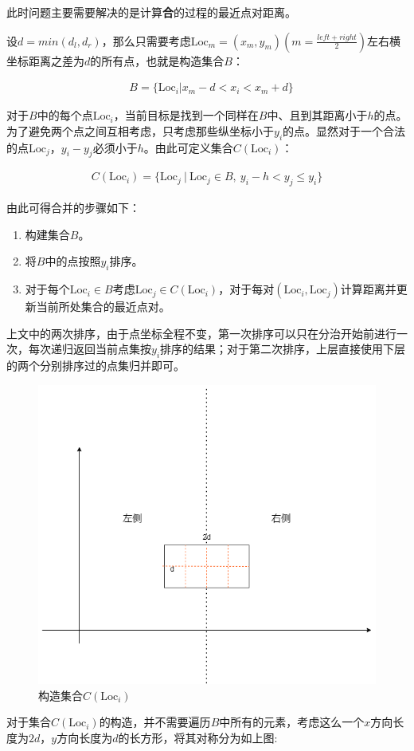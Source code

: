 \documentclass{article}
\begin{document}
此时问题主要需要解决的是计算\textbf{合}的过程的最近点对距离。

设$d = min(d_l, d_r)$，那么只需要考虑$\text{Loc}_{m}=(x_{m}, y_{m})(m = \frac{left + right}{2})$左右横坐标距离之差为$d$的所有点，也就是构造集合$B$：

\begin{align*}
    &B=\{\text{Loc}_i |x_m-d < x_i < x_m+d\}
\end{align*}

对于$B$中的每个点$\text{Loc}_i$，当前目标是找到一个同样在$B$中、且到其距离小于$h$的点。为了避免两个点之间互相考虑，只考虑那些纵坐标小于$y_i$的点。显然对于一个合法的点$\text{Loc}_j$，$y_i-y_j$必须小于$h$。由此可定义集合$C(\text{Loc}_i)$：

\begin{align*}
    C(\text{Loc}_i)=\{\text{Loc}_j\ \big|\ \text{Loc}_j\in B,\ y_i-h<y_j\le y_i\}
\end{align*}

由此可得合并的步骤如下：

\begin{enumerate}
    \item 构建集合$B$。
    \item 将$B$中的点按照$y_i$排序。
    \item 对于每个$\text{Loc}_i\in B$考虑$\text{Loc}_j\in C(\text{Loc}_i)$，对于每对$(\text{Loc}_i,\text{Loc}_j)$计算距离并更新当前所处集合的最近点对。
\end{enumerate}

上文中的两次排序，由于点坐标全程不变，第一次排序可以只在分治开始前进行一次，每次递归返回当前点集按$y_i$排序的结果；对于第二次排序，上层直接使用下层的两个分别排序过的点集归并即可。
\begin{figure}[h]
    \centering
    \includegraphics[width=0.4\linewidth]{asserts/最短点对问题.drawio.png}
    \caption{构造集合$C(\text{Loc}_i)$}
    \label{fig:enter-label}
\end{figure}

对于集合$C(\text{Loc}_i)$的构造，并不需要遍历$B$中所有的元素，考虑这么一个$x$方向长度为$2d$，$y$方向长度为$d$的长方形，将其对称分为如上图:
\end{document}
